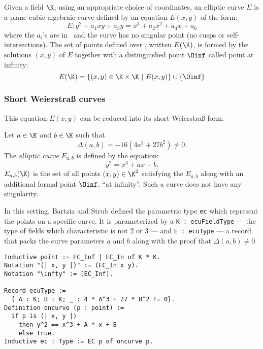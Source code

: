 \begin{dfn}
Given a field $\K$,
using an appropriate choice of coordinates,
an elliptic curve $E$
is a plane cubic algebraic curve defined by an equation $E(x,y)$ of the form:
$$E : y^2 + a_1 xy + a_3 y = x^3 + a_2 x^2 + a_4 x + a_6$$
where the $a_i$'s are in \K\ and the curve has no singular point (\ie no cusps
or self-intersections). The set of points defined over \K, written $E(\K)$, is formed by the
solutions $(x,y)$ of $E$ together with a distinguished point $\Oinf$ called point at infinity:
$$E(\K) = \{ (x,y) \in \K \times \K ~|~E(x,y)\} \cup \{\Oinf\}$$
\end{dfn}

\subsubsection{Short Weierstra{\ss} curves}
\label{subsec:ECC-Weierstrass}

This equation $E(x,y)$ can be reduced into its short Weierstra{\ss} form.

\begin{dfn}
Let $a \in \K$ and $b \in \K$ such that $$\Delta(a,b) = -16(4a^3 + 27b^2) \neq 0.$$
The \textit{elliptic curve} $E_{a,b}$ is defined by the equation:
$$y^2 = x^3 + ax + b.$$
$E_{a,b}(\K)$ is the set of all points $(x,y) \in \K^2$ satisfying the $E_{a,b}$
along with an additional formal point $\Oinf$, ``at infinity''. Such a curve does not have any singularity.
\end{dfn}

In this setting, Bartzia and Strub defined the parametric type \texttt{ec} which
represent the points on a specific curve. It is parameterized by
a \texttt{K : ecuFieldType} --- the type of fields which characteristic is not 2 or 3 ---
and \texttt{E : ecuType} --- a record that packs the curve parameters $a$ and $b$
along with the proof that $\Delta(a,b) \neq 0$.
\begin{lstlisting}[language=Coq]
Inductive point := EC_Inf | EC_In of K * K.
Notation "(| x, y |)" := (EC_In x y).
Notation "\infty" := (EC_Inf).

Record ecuType :=
  { A : K; B : K; _ : 4 * A^3 + 27 * B^2 != 0}.
Definition oncurve (p : point) :=
  if p is (| x, y |)
    then y^2 == x^3 + A * x + B
    else true.
Inductive ec : Type := EC p of oncurve p.
\end{lstlisting}

